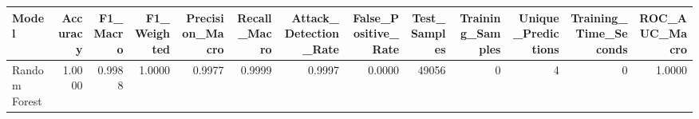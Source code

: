 \begin{tabular}{lrrrrrrrrrrrr}
\toprule
Model & Accuracy & F1_Macro & F1_Weighted & Precision_Macro & Recall_Macro & Attack_Detection_Rate & False_Positive_Rate & Test_Samples & Training_Samples & Unique_Predictions & Training_Time_Seconds & ROC_AUC_Macro \\
\midrule
Random Forest & 1.0000 & 0.9988 & 1.0000 & 0.9977 & 0.9999 & 0.9997 & 0.0000 & 49056 & 0 & 4 & 0 & 1.0000 \\
\bottomrule
\end{tabular}
